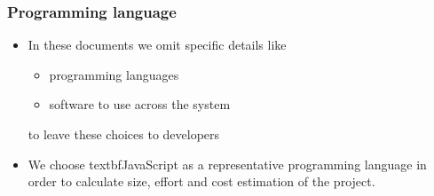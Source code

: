 
\begin{frame}
	\frametitle{Programming language}
	\begin{itemize}	
		\item In these documents we omit specific details like
			\begin{itemize}
				\item programming languages
				\item software to use across the system
			\end{itemize}
			to leave these choices to developers
		\pause
		\item We choose textbf{JavaScript} as a representative programming language in order to calculate size, effort and cost estimation of the project. 
	\end{itemize}
\end{frame}


